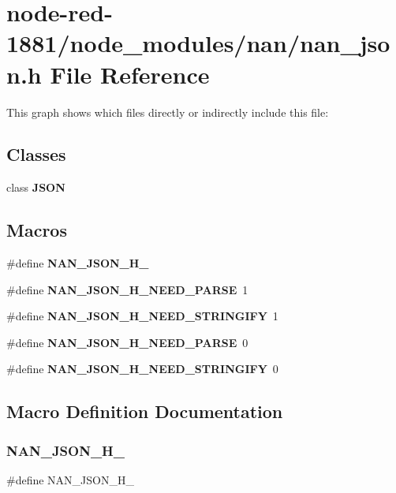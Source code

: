 \section{node-\/red-\/1881/node\+\_\+modules/nan/nan\+\_\+json.h File Reference}
\label{nan__json_8h}
This graph shows which files directly or indirectly include this file\+:
\subsection*{Classes}
\begin{DoxyCompactItemize}
\item 
class \textbf{ J\+S\+ON}
\end{DoxyCompactItemize}
\subsection*{Macros}
\begin{DoxyCompactItemize}
\item 
\#define \textbf{ N\+A\+N\+\_\+\+J\+S\+O\+N\+\_\+\+H\+\_\+}
\item 
\#define \textbf{ N\+A\+N\+\_\+\+J\+S\+O\+N\+\_\+\+H\+\_\+\+N\+E\+E\+D\+\_\+\+P\+A\+R\+SE}~1
\item 
\#define \textbf{ N\+A\+N\+\_\+\+J\+S\+O\+N\+\_\+\+H\+\_\+\+N\+E\+E\+D\+\_\+\+S\+T\+R\+I\+N\+G\+I\+FY}~1
\item 
\#define \textbf{ N\+A\+N\+\_\+\+J\+S\+O\+N\+\_\+\+H\+\_\+\+N\+E\+E\+D\+\_\+\+P\+A\+R\+SE}~0
\item 
\#define \textbf{ N\+A\+N\+\_\+\+J\+S\+O\+N\+\_\+\+H\+\_\+\+N\+E\+E\+D\+\_\+\+S\+T\+R\+I\+N\+G\+I\+FY}~0
\end{DoxyCompactItemize}


\subsection{Macro Definition Documentation}
\mbox{\label{nan_8h_ac3a44fa6031155577ef9b9e16a633819}} 
\subsubsection{N\+A\+N\+\_\+\+J\+S\+O\+N\+\_\+\+H\+\_\+}
{\footnotesize\ttfamily \#define N\+A\+N\+\_\+\+J\+S\+O\+N\+\_\+\+H\+\_\+}



